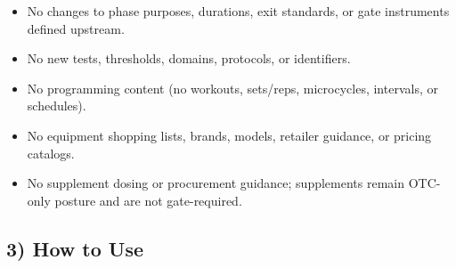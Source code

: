 \documentclass[10pt]{article}
\begin{document}
\begin{itemize}
\item No changes to phase purposes, durations, exit standards, or gate instruments defined upstream.
\item No new tests, thresholds, domains, protocols, or identifiers.
\item No programming content (no workouts, sets/reps, microcycles, intervals, or schedules).
\item No equipment shopping lists, brands, models, retailer guidance, or pricing catalogs.
\item No supplement dosing or procurement guidance; supplements remain OTC-only posture and are not gate-required.
\end{itemize}

\subsection*{3) How to Use}
\end{document}
